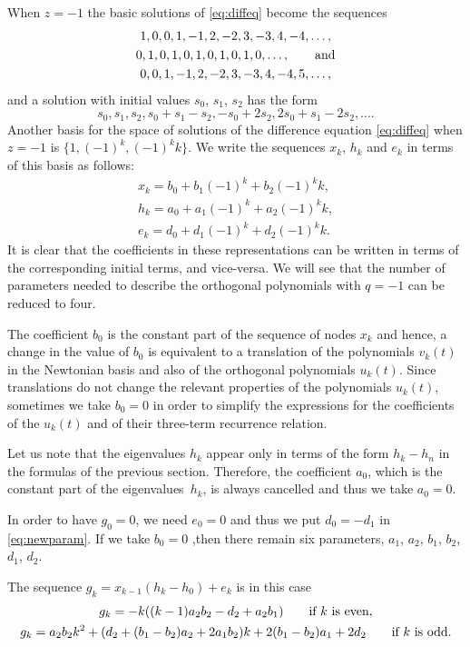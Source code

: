 \documentclass[pdftex]{sigma}
\numberwithin{equation}{section}
\begin{document}
When $z=-1$ the basic solutions of \eqref{eq:diffeq} become the sequences
\begin{gather*}
1,0,0,1,-1,2,-2,3,-3,4,-4,\dots, \\
0,1,0,1,0,1,0,1,0,1,0, \dots, \qquad \hbox{and} \\
0,0,1,-1,2,-2,3, -3, 4,-4,5, \dots,
\end{gather*}
and a solution with initial values $s_0$, $s_1$, $s_2$ has the form
\[
s_0, s_1, s_2, s_0+s_1-s_2, -s_0+2 s_2, 2 s_0 + s_1 - 2 s_2, \dots.
\]
Another basis for the space of solutions of the difference equation \eqref{eq:diffeq} when $z=-1$ is $\bigl\{ 1, (-1)^k, (-1)^k k\bigr\}$. We write the sequences $x_k$, $h_k$ and $e_k$ in terms of this basis as follows:
\begin{gather}
 x_k = b_0 + b_1 (-1)^k + b_2 (-1)^k k, \\
 h_k = a_0 + a_1 (-1)^k + a_2 (-1)^k k, \\
 e_k = d_0+ d_1 (-1)^k + d_2 (-1)^k k. \label{eq:newparam}
\end{gather}
It is clear that the coefficients in these representations can be written in terms of the corresponding initial terms, and vice-versa.
We will see that the number of parameters needed to describe the orthogonal polynomials with $q=-1$ can be reduced to four.

The coefficient $b_0$ is the constant part of the sequence of nodes $x_k$ and hence, a change in the value of $b_0$ is equivalent to a translation of the polynomials $v_k(t)$ in the Newtonian basis and also of the orthogonal polynomials $u_k(t)$. Since translations do not change the relevant properties of the polynomials $u_k(t)$, sometimes we take $b_0=0$ in order to simplify the expressions for the coefficients of the $u_k(t)$ and of their three-term recurrence relation.

Let us note that the eigenvalues $h_k$ appear only in terms of the form $h_k-h_n$ in the formulas of the previous section. Therefore,
the coefficient $a_0$, which is the constant part of the eigenvalues~$h_k$, is always cancelled and thus we take $a_0=0$.

In order to have $g_0=0$, we need $e_0=0$ and thus we put $d_0= -d_1$ in \eqref{eq:newparam}.
If we take $b_0=0$ ,then there remain six parameters, $a_1$, $a_2$, $b_1$, $b_2$, $d_1$, $d_2$.

The sequence $g_k=x_{k-1}(h_k - h_0)+ e_k$ is in this case
\begin{gather*}%
	g_k= -k ( (k-1)a_2 b_2 -d_2+ a_2 b_1) \qquad \hbox{if $k$ is even},\\
	g_k= a_2 b_2 k^2 + (d_2+ (b_1-b_2) a_2 + 2 a_1 b_2) k +2 ( b_1- b_2) a_1 + 2 d_2\qquad \hbox{if $k$ is odd}.
\end{gather*}
\end{document}
